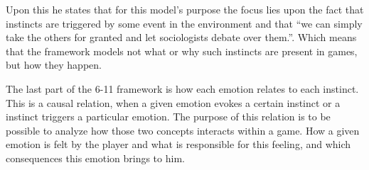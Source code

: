 Upon this he states that for this model's purpose the focus lies upon the fact that instincts are triggered by some event in the environment and that ``we can simply take the others for granted and let sociologists debate over them.''\citep{dillon_way_2010}. Which means that the framework models not what or why such instincts are present in games, but how they happen.

The last part of the 6-11 framework is how each emotion relates to each instinct. This is a causal relation, when a given emotion evokes a certain instinct or a instinct triggers a particular emotion. The purpose of this relation is to be possible to analyze how those two concepts interacts within a game. How a given emotion is felt by the player and what is responsible for this feeling, and which consequences this emotion brings to him. 
